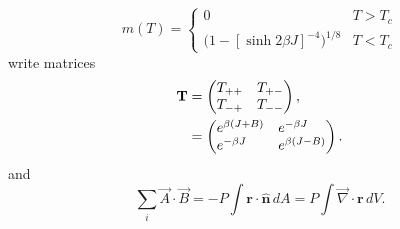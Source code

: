 \documentclass{article}
\begin{document}

\begin{equation}
\label{eq:mdiv}
m(T) =
\begin{cases}
0 & \text{$T > T_c$} \\
\bigl(1 - [\sinh 2 \beta J]^{-4} \bigr)^{\! 1/8} & \text{$T < T_c$}
\end{cases}
\end{equation}
write matrices
\begin{align}
\textbf{T} &=
\begin{pmatrix}
T_{++} \hfill & T_{+-} \\
T_{-+} & T_{--} \hfill 
\end{pmatrix} , \nonumber \\
& =
\begin{pmatrix}
e^{\beta (J + B)} \hfill & e^{-\beta J} \hfill \\
e^{-\beta J} \hfill & e^{\beta (J - B)} \hfill
\end{pmatrix}.
\end{align}
and 
\newcommand{\rv}{\textbf{r}}
\begin{equation}
\sum_i \vec A \cdot \vec B = -P\!\int\! \rv \cdot
\hat{\mathbf{n}}\, dA = P\!\int \! {\vec \nabla} \cdot \rv\, dV.
\end{equation}
\end{document}
